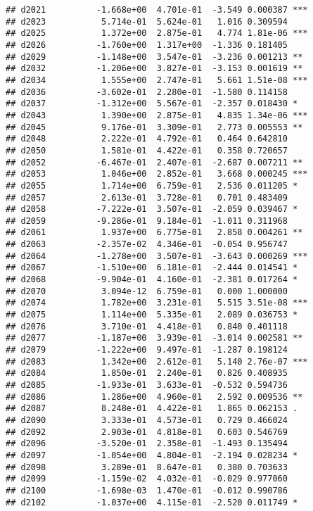 \documentclass[
]{article}
\begin{document}
\begin{verbatim}
## d2021          -1.668e+00  4.701e-01  -3.549 0.000387 ***
## d2023           5.714e-01  5.624e-01   1.016 0.309594    
## d2025           1.372e+00  2.875e-01   4.774 1.81e-06 ***
## d2026          -1.760e+00  1.317e+00  -1.336 0.181405    
## d2029          -1.148e+00  3.547e-01  -3.236 0.001213 ** 
## d2032          -1.206e+00  3.827e-01  -3.153 0.001619 ** 
## d2034           1.555e+00  2.747e-01   5.661 1.51e-08 ***
## d2036          -3.602e-01  2.280e-01  -1.580 0.114158    
## d2037          -1.312e+00  5.567e-01  -2.357 0.018430 *  
## d2043           1.390e+00  2.875e-01   4.835 1.34e-06 ***
## d2045           9.176e-01  3.309e-01   2.773 0.005553 ** 
## d2048           2.222e-01  4.792e-01   0.464 0.642810    
## d2050           1.581e-01  4.422e-01   0.358 0.720657    
## d2052          -6.467e-01  2.407e-01  -2.687 0.007211 ** 
## d2053           1.046e+00  2.852e-01   3.668 0.000245 ***
## d2055           1.714e+00  6.759e-01   2.536 0.011205 *  
## d2057           2.613e-01  3.728e-01   0.701 0.483409    
## d2058          -7.222e-01  3.507e-01  -2.059 0.039467 *  
## d2059          -9.286e-01  9.184e-01  -1.011 0.311968    
## d2061           1.937e+00  6.775e-01   2.858 0.004261 ** 
## d2063          -2.357e-02  4.346e-01  -0.054 0.956747    
## d2064          -1.278e+00  3.507e-01  -3.643 0.000269 ***
## d2067          -1.510e+00  6.181e-01  -2.444 0.014541 *  
## d2068          -9.904e-01  4.160e-01  -2.381 0.017264 *  
## d2070           3.094e-12  6.759e-01   0.000 1.000000    
## d2074           1.782e+00  3.231e-01   5.515 3.51e-08 ***
## d2075           1.114e+00  5.335e-01   2.089 0.036753 *  
## d2076           3.710e-01  4.418e-01   0.840 0.401118    
## d2077          -1.187e+00  3.939e-01  -3.014 0.002581 ** 
## d2079          -1.222e+00  9.497e-01  -1.287 0.198124    
## d2083           1.342e+00  2.612e-01   5.140 2.76e-07 ***
## d2084           1.850e-01  2.240e-01   0.826 0.408935    
## d2085          -1.933e-01  3.633e-01  -0.532 0.594736    
## d2086           1.286e+00  4.960e-01   2.592 0.009536 ** 
## d2087           8.248e-01  4.422e-01   1.865 0.062153 .  
## d2090           3.333e-01  4.573e-01   0.729 0.466024    
## d2092           2.903e-01  4.818e-01   0.603 0.546769    
## d2096          -3.520e-01  2.358e-01  -1.493 0.135494    
## d2097          -1.054e+00  4.804e-01  -2.194 0.028234 *  
## d2098           3.289e-01  8.647e-01   0.380 0.703633    
## d2099          -1.159e-02  4.032e-01  -0.029 0.977060    
## d2100          -1.698e-03  1.470e-01  -0.012 0.990786    
## d2102          -1.037e+00  4.115e-01  -2.520 0.011749 *  

\end{verbatim}
\end{document}
